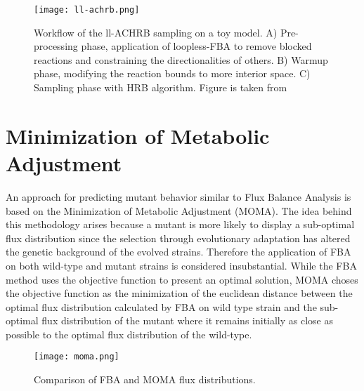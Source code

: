 \begin{figure}[H]
\begin{center}
\texttt{[image: ll-achrb.png]}
\end{center}
\caption[Workflow of the Loopless-ACHRB sampling on a toy model]{Workflow of the ll-ACHRB sampling on a toy model. A) Pre-processing phase, application of loopless-FBA to remove blocked reactions and constraining the directionalities of others. B) Warmup phase, modifying the reaction bounds to more interior space. C) Sampling phase with HRB algorithm. Figure is taken from \cite{saa2016ll}}
\label{fig:achrb}
\end{figure}


\section{Minimization of Metabolic Adjustment}
An approach for predicting mutant behavior similar to Flux Balance Analysis is based on the Minimization of Metabolic Adjustment (MOMA). The idea behind this methodology arises because a mutant is more likely to display a sub-optimal flux distribution since the selection through evolutionary adaptation has altered the genetic background of the evolved strains. Therefore the application of FBA on both wild-type and mutant strains is considered insubstantial. While the FBA method uses the objective function to present an optimal solution, MOMA choses the objective function as the minimization of the euclidean distance between the optimal flux distribution calculated by FBA on wild type strain and the sub-optimal flux distribution of the mutant where it remains initially as close as possible to the optimal flux distribution of the wild-type.

\begin{figure}[H]
\begin{center}
\texttt{[image: moma.png]}
\caption[Comparison of FBA and MOMA flux distributions]{Comparison of FBA and MOMA flux distributions.}
\end{center}
\label{fig:moma}
\end{figure}
\noindent

